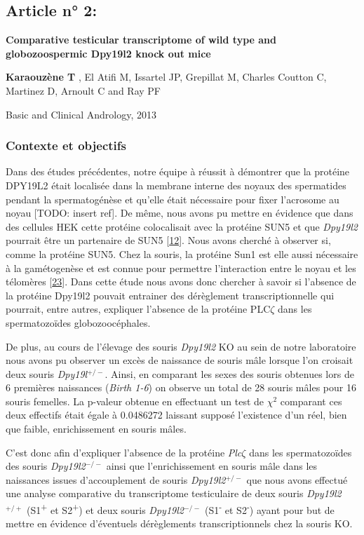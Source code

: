 \documentclass[12pt,twoside]{ugathesis}
\begin{document}
\subsection{Article n° 2:}\label{article-n-2}

\textbf{Comparative testicular transcriptome of wild type and
globozoospermic Dpy19l2 knock out mice}

\textbf{Karaouzène T} , El Atifi M, Issartel JP, Grepillat M, Charles
Coutton C, Martinez D, Arnoult C and Ray PF

Basic and Clinical Andrology, 2013

\newpage

\subsubsection{Contexte et objectifs}\label{contexte-et-objectifs-1}

Dans des études précédentes, notre équipe à réussit à démontrer que la
protéine DPY19L2 était localisée dans la membrane interne des noyaux des
spermatides pendant la spermatogénèse et qu'elle était nécessaire pour
fixer l'acrosome au noyau {[}TODO: insert ref{]}. De même, nous avons pu
mettre en évidence que dans des cellules HEK cette protéine colocalisait
avec la protéine SUN5 et que \emph{Dpy19l2} pourrait être un partenaire
de SUN5 {[}\protect\hyperlink{ref-Pierre2012}{12}{]}. Nous avons cherché
à observer si, comme la protéine SUN5. Chez la souris, la protéine Sun1
est elle aussi nécessaire à la gamétogenèse et est connue pour permettre
l'interaction entre le noyau et les télomères
{[}\protect\hyperlink{ref-Ding2007}{23}{]}. Dans cette étude nous avons
donc chercher à savoir si l'absence de la protéine Dpy19l2 pouvait
entrainer des dérèglement transcriptionnelle qui pourrait, entre autres,
expliquer l'absence de la protéine PLC\(\zeta\) dans les spermatozoïdes
globozoocéphales.

De plus, au cours de l'élevage des souris \emph{Dpy19l2} KO au sein de
notre laboratoire nous avons pu observer un excès de naissance de souris
mâle lorsque l'on croisait deux souris \emph{Dpy19l}\(^{+/-}\). Ainsi,
en comparant les sexes des souris obtenues lors de 6 premières
naissances (\emph{Birth 1-6}) on observe un total de 28 souris mâles
pour 16 souris femelles. La p-valeur obtenue en effectuant un test de
\(\chi^2\) comparant ces deux effectifs était égale à 0.0486272 laissant
supposé l'existence d'un réel, bien que faible, enrichissement en souris
mâles.

C'est donc afin d'expliquer l'absence de la protéine \emph{Plc}\(\zeta\)
dans les spermatozoïdes des souris \emph{Dpy19l2}\(^{-/-}\) ainsi que
l'enrichissement en souris mâle dans les naissances issues
d'accouplement de souris \emph{Dpy19l2}\(^{+/-}\) que nous avons
effectué une analyse comparative du transcriptome testiculaire de deux
souris \emph{Dpy19l2}\(^{+/+}\) (S1\textsuperscript{+} et
S2\textsuperscript{+}) et deux souris \emph{Dpy19l2}\(^{-/-}\)
(S1\textsuperscript{-} et S2\textsuperscript{-}) ayant pour but de
mettre en évidence d'éventuels dérèglements transcriptionnels chez la
souris KO.
\end{document}

